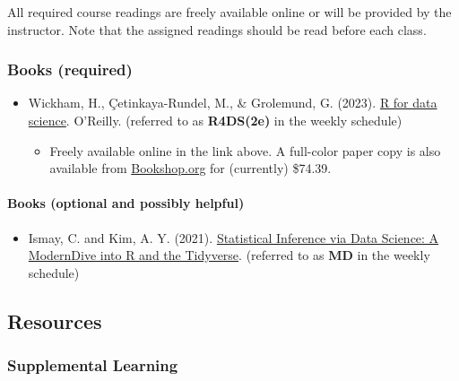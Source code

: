\documentclass[
  letterpaper,
  DIV=11,
  numbers=noendperiod]{scrartcl}
\let\oldparagraph\paragraph
\renewcommand{\paragraph}[1]{\oldparagraph{#1}\mbox{}}
\providecommand{\tightlist}{%
  \setlength{\itemsep}{0pt}\setlength{\parskip}{0pt}}\usepackage{longtable,booktabs,array}
\begin{document}
All required course readings are freely available online or will be
provided by the instructor. Note that the assigned readings should be
read before each class.

\hypertarget{books-required}{%
\subsubsection{Books (required)}\label{books-required}}

\begin{itemize}
\tightlist
\item
  Wickham, H., Çetinkaya-Rundel, M., \& Grolemund, G. (2023).
  \href{https://r4ds.hadley.nz/}{R for data science}. O'Reilly.
  (referred to as \textbf{R4DS(2e)} in the weekly schedule)

  \begin{itemize}
  \tightlist
  \item
    Freely available online in the link above. A full-color paper copy
    is also available from
    \href{https://bookshop.org/p/books/r-for-data-science-import-tidy-transform-visualize-and-model-data-hadley-wickham/19667446?ean=9781492097402\&gclid=Cj0KCQjw9rSoBhCiARIsAFOiplnsoAzgdl4pxcZmN-bzyI4Y6TCNx5ph3lS-nF62MgiIIcxjLclBfeAaAp9sEALw_wcB}{Bookshop.org}
    for (currently) \$74.39.
  \end{itemize}
\end{itemize}

\hypertarget{books-optional-and-possibly-helpful}{%
\paragraph{Books (optional and possibly
helpful)}\label{books-optional-and-possibly-helpful}}

\begin{itemize}
\tightlist
\item
  Ismay, C. and Kim, A. Y. (2021).
  \href{https://moderndive.com/}{Statistical Inference via Data Science:
  A ModernDive into R and the Tidyverse}. (referred to as \textbf{MD} in
  the weekly schedule)
\end{itemize}

\hypertarget{resources}{%
\subsection{Resources}\label{resources}}

\hypertarget{supplemental-learning}{%
\subsubsection{Supplemental Learning}\label{supplemental-learning}}
\end{document}
